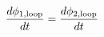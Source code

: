 \documentclass[preview]{standalone}
\begin{document}
\begin{align*}
{d \phi_{1,\text{loop}} \over d t} = {d \phi_{2,\text{loop}} \over d t}
\end{align*}
\end{document}
